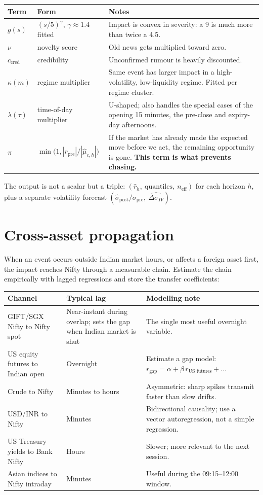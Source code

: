 \begin{longtable}{@{}p{2.2cm}p{4.0cm}p{8.4cm}@{}}
\toprule
\textbf{Term} & \textbf{Form} & \textbf{Notes}\\
\midrule
$g(s)$ & $\left(s/5\right)^{\gamma}$, $\gamma \approx 1.4$ fitted &
Impact is convex in severity: a 9 is much more than twice a 4.5.\\
$\nu$ & novelty score & Old news gets multiplied toward zero.\\
$c_{\text{cred}}$ & credibility & Unconfirmed rumour is heavily discounted.\\
$\kappa(m)$ & regime multiplier & Same event has larger impact in a
high-volatility, low-liquidity regime. Fitted per regime cluster.\\
$\lambda(\tau)$ & time-of-day multiplier & U-shaped; also handles the special
cases of the opening 15 minutes, the pre-close and expiry-day afternoons.\\
$\pi$ & $\min\!\big(1, |r_{\text{pre}}| / |\hat\mu_{c,h}|\big)$ &
If the market has already made the expected move before we act, the remaining
opportunity is gone. \textbf{This term is what prevents chasing.}\\
\bottomrule
\end{longtable}

The output is not a scalar but a triple: $(\hat r_h,\ \text{quantiles},\
n_{\text{eff}})$ for each horizon $h$, plus a separate volatility forecast
$(\hat\sigma_{\text{post}}/\sigma_{\text{pre}},\ \widehat{\Delta\sigma_{IV}})$.

\section{Cross-asset propagation}

When an event occurs outside Indian market hours, or affects a foreign asset
first, the impact reaches Nifty through a measurable chain. Estimate the chain
empirically with lagged regressions and store the transfer coefficients:

\begin{longtable}{@{}p{3.6cm}p{3.2cm}p{7.8cm}@{}}
\toprule
\textbf{Channel} & \textbf{Typical lag} & \textbf{Modelling note}\\
\midrule
GIFT/SGX Nifty to Nifty spot & Near-instant during overlap; sets the gap when
Indian market is shut & The single most useful overnight variable.\\
US equity futures to Indian open & Overnight & Estimate a gap model:
$r_{\text{gap}} = \alpha + \beta\, r_{\text{US futures}} + \ldots$\\
Crude to Nifty & Minutes to hours & Asymmetric: sharp spikes transmit faster
than slow drifts.\\
USD/INR to Nifty & Minutes & Bidirectional causality; use a vector
autoregression, not a simple regression.\\
US Treasury yields to Bank Nifty & Hours & Slower; more relevant to the next
session.\\
Asian indices to Nifty intraday & Minutes & Useful during the 09:15--12:00
window.\\
\bottomrule
\end{longtable}

